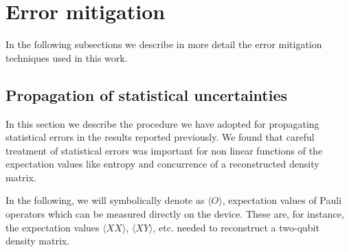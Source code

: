 \documentclass[Dual]{msu-thesis}
\begin{document}
\section{Error mitigation}
\label{app:error_mit}
In the following subsections we describe in more detail the error mitigation techniques used in this work. 

\subsection{Propagation of statistical uncertainties}
\label{app:posterior_sampling}

In this section we describe the procedure we have adopted for propagating statistical errors in the results reported previously. We found that careful treatment of statistical errors was important for non linear functions of the expectation values like entropy and concurrence of a reconstructed density matrix.

In the following, we will symbolically denote as $\langle O\rangle$, expectation values of Pauli operators which can be measured directly on the device. These are, for instance, the expectation values $\langle X X\rangle$, $\langle X Y\rangle$, etc. needed to reconstruct a two-qubit density matrix.
\end{document}
